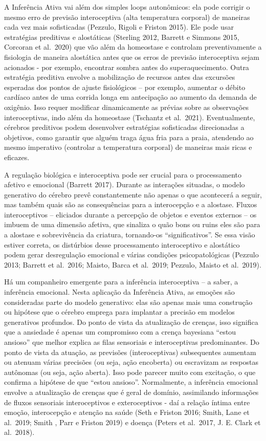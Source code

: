 \documentclass[
  12pt,
]{book}
\begin{document}
A Inferência Ativa vai além dos simples loops autonômicos: ela pode corrigir o mesmo erro de previsão interoceptiva (alta temperatura corporal) de maneiras cada vez mais sofisticadas (Pezzulo, Rigoli e Friston 2015). Ele pode usar estratégias preditivas e alostáticas (Sterling 2012, Barrett e Simmons 2015, Corcoran et al.~2020) que vão além da homeostase e controlam preventivamente a fisiologia de maneira alostática antes que os erros de previsão interoceptiva sejam acionados - por exemplo, encontrar sombra antes do superaquecimento. Outra estratégia preditiva envolve a mobilização de recursos antes das excursões esperadas dos pontos de ajuste fisiológicos -- por exemplo, aumentar o débito cardíaco antes de uma corrida longa em antecipação ao aumento da demanda de oxigênio. Isso requer modificar dinamicamente as prévias sobre as observações interoceptivas, indo além da homeostase (Tschantz et al.~2021). Eventualmente, cérebros preditivos podem desenvolver estratégias sofisticadas direcionadas a objetivos, como garantir que alguém traga água fria para a praia, atendendo ao mesmo imperativo (controlar a temperatura corporal) de maneiras mais ricas e eficazes.

A regulação biológica e interoceptiva pode ser crucial para o processamento afetivo e emocional (Barrett 2017). Durante as interações situadas, o modelo generativo do cérebro prevê constantemente não apenas o que acontecerá a seguir, mas também quais são as consequências para a interocepção e a alostase. Fluxos interoceptivos -- eliciados durante a percepção de objetos e eventos externos -- os imbuem de uma dimensão afetiva, que sinaliza o quão bons ou ruins eles são para a alostase e sobrevivência da criatura, tornando-os ``significativos''. Se essa visão estiver correta, os distúrbios desse processamento interoceptivo e alostático podem gerar desregulação emocional e várias condições psicopatológicas (Pezzulo 2013; Barrett et al.~2016; Maisto, Barca et al.~2019; Pezzulo, Maisto et al.~2019).

Há um companheiro emergente para a inferência interoceptiva -- a saber, a inferência emocional. Nesta aplicação da Inferência Ativa, as emoções são consideradas parte do modelo generativo: elas são apenas mais uma construção ou hipótese que o cérebro emprega para implantar a precisão em modelos generativos profundos. Do ponto de vista da atualização de crenças, isso significa que a ansiedade é apenas um compromisso com a crença bayesiana ``estou ansioso'' que melhor explica as filas sensoriais e interoceptivas predominantes. Do ponto de vista da atuação, as previsões (interoceptivas) subsequentes aumentam ou atenuam várias precisões (ou seja, ação encoberta) ou escravizam as respostas autônomas (ou seja, ação aberta). Isso pode parecer muito com excitação, o que confirma a hipótese de que ``estou ansioso''. Normalmente, a inferência emocional envolve a atualização de crenças que é geral de domínio, assimilando informações de fluxos sensoriais interoceptivos e exteroceptivos - daí a relação íntima entre emoção, interocepção e atenção na saúde (Seth e Friston 2016; Smith, Lane et al.~2019; Smith , Parr e Friston 2019) e doença (Peters et al.~2017, J. E. Clark et al.~2018).
\end{document}
